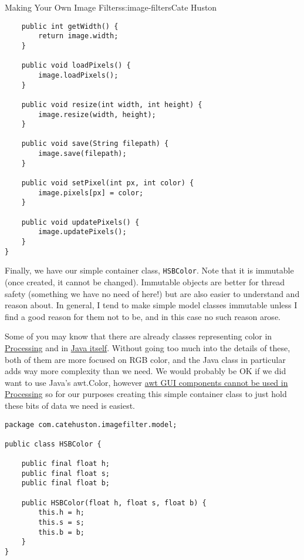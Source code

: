 \begin{aosachapter}{Making Your Own Image Filters}{s:image-filters}{Cate Huston}
\begin{verbatim}
    public int getWidth() {
        return image.width;
    }

    public void loadPixels() {
        image.loadPixels();
    }

    public void resize(int width, int height) {
        image.resize(width, height);
    }

    public void save(String filepath) {
        image.save(filepath);
    }

    public void setPixel(int px, int color) {
        image.pixels[px] = color;
    }

    public void updatePixels() {
        image.updatePixels();
    }
}
\end{verbatim}

Finally, we have our simple container class, \texttt{HSBColor}. Note
that it is immutable (once created, it cannot be changed). Immutable
objects are better for thread safety (something we have no need of
here!) but are also easier to understand and reason about. In general, I
tend to make simple model classes immutable unless I find a good reason
for them not to be, and in this case no such reason arose.

Some of you may know that there are already classes representing color
in
\href{https://www.processing.org/reference/color_datatype.html}{Processing}
and in
\href{https://docs.oracle.com/javase/7/docs/api/java/awt/Color.html}{Java
itself}. Without going too much into the details of these, both of them
are more focused on RGB color, and the Java class in particular adds way
more complexity than we need. We would probably be OK if we did want to
use Java's awt.Color, however
\href{http://processing.org/reference/javadoc/core/processing/core/PApplet.html}{awt
GUI components cannot be used in Processing} so for our purposes
creating this simple container class to just hold these bits of data we
need is easiest.

\begin{verbatim}
package com.catehuston.imagefilter.model;

public class HSBColor {

    public final float h;
    public final float s;
    public final float b;

    public HSBColor(float h, float s, float b) {
        this.h = h;
        this.s = s;
        this.b = b;
    }
}
\end{verbatim}

\label{colorhelper-and-associated-tests}


\end{aosachapter}
